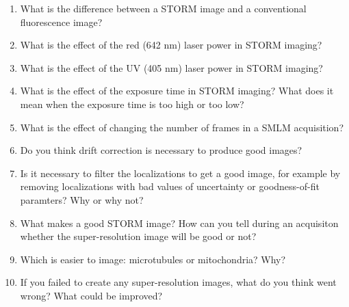 \documentclass[10pt,a4paper,oneside]{book}
\begin{document}
\begin{enumerate}
    \item{What is the difference between a STORM image and a conventional fluorescence image?}
    \item{What is the effect of the red (642 nm) laser power in STORM imaging?}
    \item{What is the effect of the UV (405 nm) laser power in STORM imaging?}
    \item{What is the effect of the exposure time in STORM imaging? What does it mean when the exposure time is too high or too low?}
    \item{What is the effect of changing the number of frames in a SMLM acquisition?}
    \item{Do you think drift correction is necessary to produce good images?}
    \item{Is it necessary to filter the localizations to get a good image, for example by removing localizations with bad values of uncertainty or goodness-of-fit paramters? Why or why not?}
    \item{What makes a good STORM image? How can you tell during an acquisiton whether the super-resolution image will be good or not?}
    \item{Which is easier to image: microtubules or mitochondria? Why?}
    \item{If you failed to create any super-resolution images, what do you think went wrong? What could be improved?}
\end{enumerate}
\end{document}
